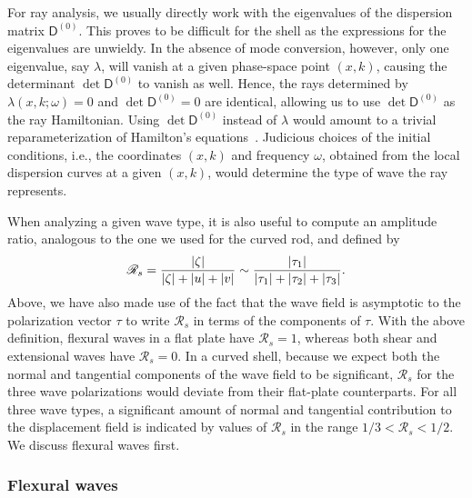 For ray analysis, we usually directly work with the eigenvalues of the dispersion matrix $\mathsf{D}^{(0)}$.
This proves to be difficult for the shell as the expressions for the eigenvalues are unwieldy.
In the absence of mode conversion, however, only one eigenvalue, say $\lambda$, will vanish at a given phase-space point $(x, k)$, causing the determinant $\det\mathsf{D}^{(0)}$ to vanish as well.
Hence, the rays determined by $\lambda(x, k; \omega) = 0$ and $\det\mathsf{D}^{(0)} = 0$ are identical, allowing us to use $\det\mathsf{D}^{(0)}$ as the ray Hamiltonian.
Using $\det\mathsf{D}^{(0)}$ instead of $\lambda$ would amount to a trivial reparameterization of Hamilton's equations~\cite{tracy2014}.
Judicious choices of the initial conditions, i.e., the coordinates $(x, k)$ and frequency $\omega$, obtained from the local dispersion curves at a given $(x, k)$, would determine the type of wave the ray represents.

When analyzing a given wave type, it is also useful to compute an amplitude ratio, analogous to the one we used for the curved rod, and defined by
%
\begin{equation}
  \mathscr{R}_{s} = \frac{\lvert\zeta\rvert}{\lvert\zeta\rvert + \lvert u\rvert + \lvert v\rvert} \sim \frac{\lvert\tau_{1}\rvert}{\lvert\tau_{1}\rvert + \lvert\tau_{2}\rvert + \lvert\tau_{3}\rvert}.
  \label{eq:shell_ratio}
\end{equation}
%
Above, we have also made use of the fact that the wave field is asymptotic to the polarization vector $\tau$ to write $\mathscr{R}_{s}$ in terms of the components of $\tau$.
With the above definition, flexural waves in a flat plate have $\mathscr{R}_{s} = 1$, whereas both shear and extensional waves have $\mathscr{R}_{s} = 0$.
In a curved shell, because we expect both the normal and tangential components of the wave field to be significant, $\mathscr{R}_{s}$ for the three wave polarizations would deviate from their flat-plate counterparts.
For all three wave types, a significant amount of normal and tangential contribution to the displacement field is indicated by values of $\mathscr{R}_{s}$ in the range $1/3 < \mathscr{R}_{s} < 1/2$.
We discuss flexural waves first.

\subsubsection{Flexural waves}

